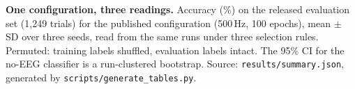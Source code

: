 \begin{table}[t]
\centering
\small
\caption{\textbf{One configuration, three readings.} Accuracy (\%) on the released evaluation set
(1{,}249 trials) for the published configuration (500\,Hz, 100 epochs), mean $\pm$ SD over three
seeds, read from the same runs under three selection rules. Permuted: training labels shuffled,
evaluation labels intact. The 95\% CI for the no-EEG classifier is a run-clustered bootstrap.
Source: \texttt{results/summary.json}, generated by \texttt{scripts/generate\_tables.py}.}
\label{tab:repro}

\end{table}
